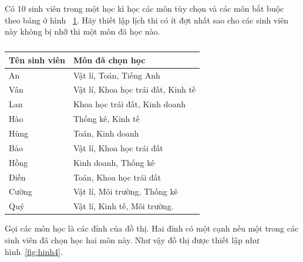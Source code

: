 \documentclass[11pt]{article}
\begin{document}
\begin{shortanswer}[title={\relax}, rearrange=no]
\begin{question}%
Có 10 sinh viên trong một học kì học các môn tùy chọn và các môn bắt buộc theo bảng ở hình ~\ref{fig:hinh00}. Hãy thiết lập lịch thi có ít đợt nhất   sao cho  các sinh viên này không bị nhỡ thi một môn đã học nào.
\begin{table}[!htp]
\centering
\begin{tabular}{ l  l }
 Tên sinh viên & Môn đã chọn học \\
\hline
 An & Vật lí, Toán, Tiếng Anh \\
Vân& Vật lí, Khoa học trái đất, Kinh tế\\
Lan & Khoa học trái đất, Kinh doanh\\
Hào &Thống kê, Kinh tế\\
Hùng&Toán, Kinh doanh\\
Bảo&Vật lí, Khoa học trái đất\\
Hồng& Kinh doanh, Thống kê\\
Điền &Toán, Khoa học trái đất\\
Cường&Vật lí, Môi trường, Thống kê\\
Quý&Vật lí, Kinh tế, Môi trường.
\end{tabular}
\caption{}\label{fig:hinh00}
\end{table}
\begin{answer}
Gọi các môn học là các đỉnh của đồ thị. Hai đỉnh có một cạnh nếu một trong các sinh viên đã chọn học hai môn này. Như vậy đồ thị được thiết lập như hình~\ref{fig:hinh4}. 


\end{answer}
\end{question}
\end{shortanswer}
\end{document}
